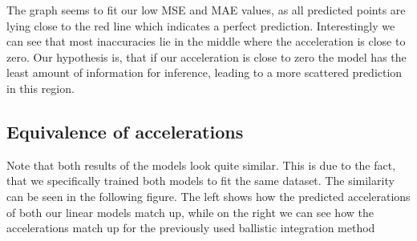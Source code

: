 The graph seems to fit our low MSE and MAE values, as all predicted points are lying close to the red line which indicates
a perfect prediction.
Interestingly we can see that most inaccuracies lie in the middle where the acceleration is close to zero.
Our hypothesis is, that if our acceleration is close to zero the model has the least amount of information for inference, leading
to a more scattered prediction in this region.

\subsection{Equivalence of accelerations}

Note that both results of the models look quite similar. 
This is due to the fact, that we specifically trained both models to fit the same dataset. 
The similarity can be seen in the following figure.
The left shows how the predicted accelerations of both our linear models match up, while on the right we can see how the 
accelerations match up for the previously used ballistic integration method

